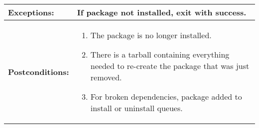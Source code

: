 \begin{tabularx}{\linewidth}{|l|X|}
\\
\hline 
\textbf{Exceptions:} & 
If package not installed, exit with success.
\\
\hline 
\textbf{Postconditions:} &
\begin{minipage}{\linewidth}
  \vspace{0.05em}
  \begin{enumerate}
    \item The package is no longer installed.
    \item There is a tarball containing everything needed to re-create the package that was just removed.
    \item For broken dependencies, package added to install or uninstall queues.
  \end{enumerate}
  \vspace{0.05em}
\end{minipage}
\\
\hline
\end{tabularx}

